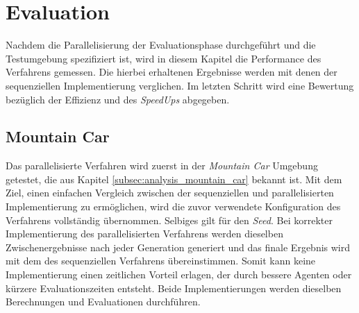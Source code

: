 \section{Evaluation}
Nachdem die Parallelisierung der Evaluationsphase durchgeführt und die Testumgebung spezifiziert ist, wird in diesem Kapitel die Performance des Verfahrens gemessen. Die hierbei erhaltenen Ergebnisse werden mit denen der sequenziellen Implementierung verglichen. Im letzten Schritt wird eine Bewertung bezüglich der Effizienz und des \emph{SpeedUps} abgegeben.

\subsection{Mountain Car}
\label{subsec:mountain_car_optimzation}
Das parallelisierte Verfahren wird zuerst in der \emph{Mountain Car} Umgebung getestet, die aus Kapitel \ref{subsec:analysis_mountain_car} bekannt ist. Mit dem Ziel, einen einfachen Vergleich zwischen der sequenziellen und parallelisierten Implementierung zu ermöglichen, wird die zuvor verwendete Konfiguration des Verfahrens vollständig übernommen. Selbiges gilt für den \emph{Seed}. Bei korrekter Implementierung des parallelisierten Verfahrens werden dieselben Zwischenergebnisse nach jeder Generation generiert und das finale Ergebnis wird mit dem des sequenziellen Verfahrens übereinstimmen. Somit kann keine Implementierung einen zeitlichen Vorteil erlagen, der durch bessere Agenten oder kürzere Evaluationszeiten entsteht. Beide Implementierungen werden dieselben Berechnungen und Evaluationen durchführen.

